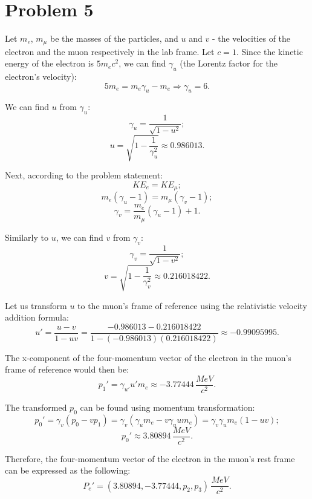 \documentclass{article}
\begin{document}
\section*{Problem 5}
Let $m_e$, $m_\mu$ be the masses of the particles, and $u$ and $v$ - the velocities of the electron and the muon respectively in the lab frame. Let $c=1$. Since the kinetic energy of the electron is $5m_ec^2$, we can find $\gamma_u$ (the Lorentz factor for the electron's velocity):
\[
5m_e = m_e\gamma_u - m_e \Rightarrow \gamma_u = 6.
\]

We can find $u$ from $\gamma_u$:
\[
\gamma_u = \frac{1}{\sqrt{1 - u^2}};
\]
\[
u = \sqrt{1 - \frac{1}{\gamma_u^2}} \approx 0.986013.
\]

Next, according to the problem statement:
\[
KE_e = KE_\mu;
\]
\[
m_e(\gamma_u - 1) = m_\mu(\gamma_v - 1);
\]
\[
\gamma_v = \frac{m_e}{m_\mu}(\gamma_u - 1) + 1.
\]

Similarly to $u$, we can find $v$ from $\gamma_v$:
\[
\gamma_v = \frac{1}{\sqrt{1 - v^2}};
\]
\[
v = \sqrt{1 - \frac{1}{\gamma_v^2}} \approx 0.216018422.
\]

Let us transform $u$ to the muon's frame of reference using the relativistic velocity addition formula:
\[
u\prime = \frac{u-v}{1-uv} = \frac{-0.986013 - 0.216018422}{1 - (-0.986013)(0.216018422)} \approx -0.99095995.
\]

The x-component of the four-momentum vector of the electron in the muon's frame of reference would then be:
\[
p_1\prime = \gamma_{u\prime} u\prime m_e \approx -3.77444\,\frac{MeV}{c^2}.
\]

The transformed $p_0$ can be found using momentum transformation:
\[
p_0\prime = \gamma_v(p_0 - vp_1) = \gamma_v(\gamma_u m_e - v \gamma_u u m_e) = \gamma_v \gamma_u m_e (1 - uv);
\]
\[
p_0\prime \approx 3.80894\,\frac{MeV}{c^2}.
\]

Therefore, the four-momentum vector of the electron in the muon's rest frame can be expressed as the following:
\[
P_e\prime = (3.80894, -3.77444, p_2, p_3)\,\frac{MeV}{c^2}.
\]
\end{document}
